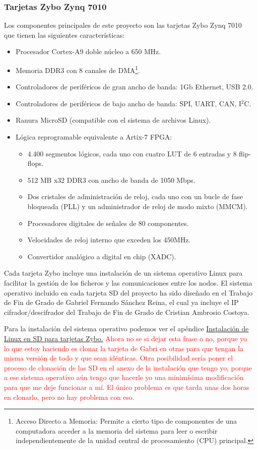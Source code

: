 \subsubsection{Tarjetas Zybo Zynq 7010}
Los componentes principales de este proyecto son las tarjetas Zybo Zynq 7010 que tienen las siguientes características:
\begin{itemize}
	\item Procesador Cortex-A9 doble núcleo a 650 MHz.
	\item Memoria DDR3 con 8 canales de DMA\footnote{Acceso Directo a Memoria: Permite a cierto tipo de componentes de una computadora acceder a la memoria del sistema para leer o escribir independientemente de la unidad central de procesamiento (CPU) principal.}.
	\item Controladores de periféricos de gran ancho de banda: 1Gb Ethernet, USB 2.0.
	\item Controladores de periféricos de bajo ancho de banda: SPI, UART, CAN, I$^2$C.
	\item Ranura MicroSD (compatible con el sistema de archivos Linux).
	\item Lógica reprogramable equivalente a Artix-7 FPGA:
	\begin{itemize}
		\item 4.400 segmentos lógicos, cada uno con cuatro LUT de 6 entradas y 8 flip-flops.
		\item 512 MB x32 DDR3 con ancho de banda de 1050 Mbps.
		\item Dos cristales de administración de reloj, cada uno con un bucle de fase bloqueada (PLL) y un administrador de reloj de modo mixto (MMCM).
		\item Procesadores digitales de señales de 80 componentes.
		\item Velocidades de reloj interno que exceden los 450MHz.
		\item Convertidor analógico a digital en chip (XADC).
	\end{itemize}
\end{itemize}

Cada tarjeta Zybo incluye una instalación de un sistema operativo Linux para facilitar la gestión de los ficheros y las comunicaciones entre los nodos. El sistema operativo incluido en cada tarjeta SD del proyecto ha sido diseñado en el Trabajo de Fin de Grado de Gabriel Fernando Sánchez Reina, el cual ya incluye el IP cifrador/descifrador del Trabajo de Fin de Grado de Cristian Ambrosio Costoya.

Para la instalación del sistema operativo podemos ver el apéndice \hyperlink{InstalacionLinux}{Instalación de Linux en SD para tarjetas Zybo.} \textcolor{red}{Ahora no se si dejar esta frase o no, porque yo lo que estoy haciendo es clonar la tarjeta de Gabri en otras para que tengan la misma versión de todo y que sean idénticas. Otra posibilidad sería poner el proceso de clonación de las SD en el anexo de la instalación que tengo yo, porque a ese sistema operativo aún tengo que hacerle yo una minimísima modificación para que me deje funcionar a mí. El único problema es que tarda unas dos horas en clonarlo, pero no hay problema con eso.}

